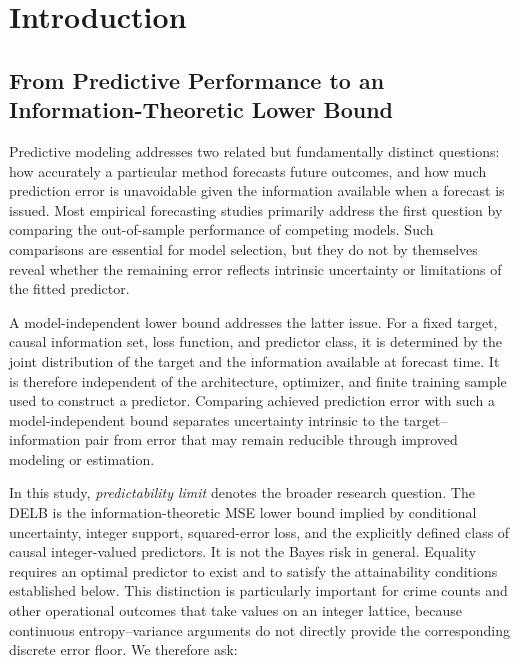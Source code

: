 \documentclass[applsci,article,submit,moreauthors]{Definitions/mdpi}
\begin{document}


\iffalse
\section{Introduction}
\label{sec:introduction}

\subsection{From Predictive Performance to an Information-Theoretic Lower Bound}
\label{subsec:intro_prediction_limit}

Predictive modeling addresses two related but fundamentally distinct
questions: how accurately a particular method forecasts future outcomes,
and how much prediction error is unavoidable given the information
available when a forecast is issued. Most empirical forecasting studies
primarily address the first question by comparing the out-of-sample
performance of competing models. Such comparisons are essential for
model selection, but they do not by themselves reveal whether the remaining
error reflects intrinsic uncertainty or limitations of the fitted predictor.

A model-independent lower bound addresses the latter issue. For a fixed
target, causal information set, loss function, and predictor class, it is
determined by the joint distribution of the target and the information
available at forecast time. It is therefore independent of
the architecture, optimizer, and finite training sample used to construct
a predictor. Comparing achieved prediction error with such a model-independent
bound separates uncertainty intrinsic to the target--information pair from
error that may remain reducible through improved modeling or estimation.

In this study, \textit{predictability limit} denotes the broader research
question. The DELB is the information-theoretic MSE lower bound implied by
conditional uncertainty, integer support, squared-error loss, and the
explicitly defined class of causal integer-valued predictors. It is not
the Bayes risk in general. Equality requires an optimal predictor to exist
and to satisfy the attainability conditions established below. This
distinction is particularly important for
crime counts and other operational outcomes that take values on an
integer lattice, because continuous entropy--variance arguments do
not directly provide the corresponding discrete error floor.
We therefore ask:
\end{document}
